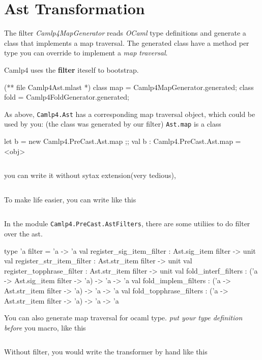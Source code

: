 \section{Ast Transformation}
\label{transform}

The filter \emph{Camlp4MapGenerator} reads \emph{OCaml} type
definitions and generate a class that implements a map traversal.  The
generated class have a method per type you can override to implement a
\emph{map traversal}.

Camlp4 uses the \textbf{ filter} iteself to bootstrap.


\begin{bluecode}
(** file Camlp4Ast.mlast *)
class map = Camlp4MapGenerator.generated;
class fold = Camlp4FoldGenerator.generated;
\end{bluecode}

As above, \verb|Camlp4.Ast| has a corresponding map traversal object,
which could be used by you: (the class was generated by our filter)
\verb|Ast.map| is a class
\begin{bluecode}
let b = new Camlp4.PreCast.Ast.map ;;
val b : Camlp4.PreCast.Ast.map = <obj>
\end{bluecode}

\inputminted[firstline=1,lastline=9]{ocaml}{camlp4/code/ast_add_zero.ml}
you can write it without sytax extension(very tedious),
\inputminted[firstline=11,lastline=31]{ocaml}{camlp4/code/ast_add_zero.ml}
To make life easier, you can write like this 
\inputminted[firstline=32,lastline=38]{ocaml}{camlp4/code/ast_add_zero.ml}

In the module \verb|Camlp4.PreCast.AstFilters|, there are some
utiliies to do filter over the ast.
\begin{bluecode}
    type 'a filter = 'a -> 'a
    val register_sig_item_filter : Ast.sig_item filter -> unit
    val register_str_item_filter : Ast.str_item filter -> unit
    val register_topphrase_filter : Ast.str_item filter -> unit
    val fold_interf_filters : ('a -> Ast.sig_item filter -> 'a) -> 'a -> 'a
    val fold_implem_filters : ('a -> Ast.str_item filter -> 'a) -> 'a -> 'a
    val fold_topphrase_filters :
      ('a -> Ast.str_item filter -> 'a) -> 'a -> 'a
\end{bluecode}


You can also generate map traversal for ocaml type. \emph{put your
  type definition before} you macro, like this
\inputminted{ocaml}{camlp4/code/ast_map.ml}
Without filter, you would write the transformer by hand like this 
\inputminted{ocaml}{camlp4/code/ast_map_o.ml}


